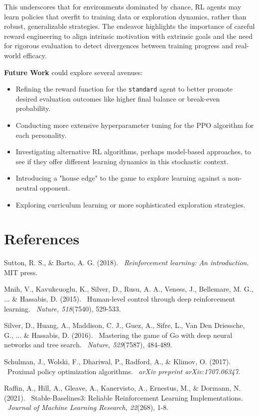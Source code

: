 \documentclass{article}
\begin{document}
This underscores that for environments dominated by chance, RL agents may learn policies that overfit to training data or exploration dynamics, rather than robust, generalizable strategies. The endeavor highlights the importance of careful reward engineering to align intrinsic motivation with extrinsic goals and the need for rigorous evaluation to detect divergences between training progress and real-world efficacy.

\textbf{Future Work} could explore several avenues:
\begin{itemize}
    \item Refining the reward function for the \texttt{standard} agent to better promote desired evaluation outcomes like higher final balance or break-even probability.
    \item Conducting more extensive hyperparameter tuning for the PPO algorithm for each personality.
    \item Investigating alternative RL algorithms, perhaps model-based approaches, to see if they offer different learning dynamics in this stochastic context.
    \item Introducing a "house edge" to the game to explore learning against a non-neutral opponent.
    \item Exploring curriculum learning or more sophisticated exploration strategies.
\end{itemize}

\section*{References}
\begin{thebibliography}{9}
    Sutton, R. S., \& Barto, A. G. (2018). \
    \textit{Reinforcement learning: An introduction}. MIT press.
    
    Mnih, V., Kavukcuoglu, K., Silver, D., Rusu, A. A., Veness, J., Bellemare, M. G., ... \& Hassabis, D. (2015). \
    Human-level control through deep reinforcement learning. \
    \textit{Nature, 518}(7540), 529-533.
    
    \bibitem{Silver2016}
    Silver, D., Huang, A., Maddison, C. J., Guez, A., Sifre, L., Van Den Driessche, G., ... \& Hassabis, D. (2016). \
    Mastering the game of Go with deep neural networks and tree search. \
    \textit{Nature, 529}(7587), 484-489.

    Schulman, J., Wolski, F., Dhariwal, P., Radford, A., \& Klimov, O. (2017). \
    Proximal policy optimization algorithms. \
    \textit{arXiv preprint arXiv:1707.06347}.
    
    \bibitem{Raffin2021}
    Raffin, A., Hill, A., Gleave, A., Kanervisto, A., Ernestus, M., \& Dormann, N. (2021). \
    Stable-Baselines3: Reliable Reinforcement Learning Implementations. \
    \textit{Journal of Machine Learning Research, 22}(268), 1-8.

\end{thebibliography}
\end{document}
